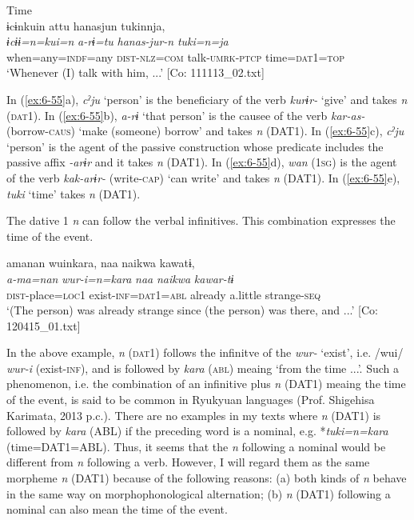 \ex Time\\
{\TM}
\glll  ɨcɨnkuin  attu  hanasjun   tukinnja,\\
\textit{ɨcɨɨ=n=kui=n}  \textit{a-rɨ=tu}  \textit{hanas-jur-n} \textit{tuki=n=ja}\\
when=any=\textsc{indf}=any  \textsc{dist}-\textsc{nlz}=\textsc{com}  talk-\textsc{umrk}-\textsc{ptcp}    time=\textsc{dat}1=\textsc{top}\\
\glt ‘Whenever (I) talk with him, ...’ [Co: 111113\_02.txt]
\z

In (\ref{ex:6-55}a), \textit{cˀju} ‘person’ is the beneficiary of the verb \textit{kurɨr-} ‘give’ and takes \textit{n} (\textsc{dat}1). In (\ref{ex:6-55}b), \textit{a-rɨ} ‘that person’ is the causee of the verb \textit{kar-as-} (borrow-\textsc{caus}) ‘make (someone) borrow’ and takes \textit{n} (DAT1). In (\ref{ex:6-55}c), \textit{cˀju} ‘person’ is the agent of the passive construction whose predicate includes the passive affix \textit{-arɨr} and it takes \textit{n} (DAT1). In (\ref{ex:6-55}d), \textit{wan} (1\textsc{sg}) is the agent of the verb \textit{kak-arɨr-} (write-\textsc{cap}) ‘can write’ and takes \textit{n} (DAT1). In (\ref{ex:6-55}e), \textit{tuki} ‘time’ takes \textit{n} (DAT1).

  The dative 1 \textit{n} can follow the verbal infinitives. This combination expresses the time of the event.

\ea\label{ex:6-56}
{\TM}
\glll amanan  wuinkara,  naa  naikwa  kawatɨ,\\
\textit{a-ma=nan}  \textit{wur-i=n=kara}  \textit{naa}  \textit{naikwa}  \textit{kawar-tɨ}\\
\textsc{dist}-place=\textsc{loc1}  exist-\textsc{inf}=\textsc{dat}1=\textsc{abl}  already  a.little  strange-\textsc{seq}\\
\glt    ‘(The person) was already strange since (the person) was there, and ...’ [Co: 120415\_01.txt]
\z

In the above example, \textit{n} (\textsc{dat}1) follows the infinitve of the \textit{wur-} ‘exist’, i.e. /wui/ \textit{wur-i} (exist-\textsc{inf}), and is followed by \textit{kara} (\textsc{abl}) meaing ‘from the time ...’. Such a phenomenon, i.e. the combination of an infinitive plus \textit{n} (DAT1) meaing the time of the event, is said to be common in Ryukyuan languages (Prof. Shigehisa Karimata, 2013 p.c.). There are no examples in my texts where \textit{n} (DAT1) is followed by \textit{kara} (ABL) if the preceding word is a nominal, e.g. *\textit{tuki=n=kara} (time=DAT1=ABL). Thus, it seems that the \textit{n} following a nominal would be different from \textit{n} following a verb. However, I will regard them as the same morpheme \textit{n} (DAT1) because of the following reasons: (a) both kinds of \textit{n} behave in the same way on morphophonological alternation; (b) \textit{n} (DAT1) following a nominal can also mean the time of the event.

